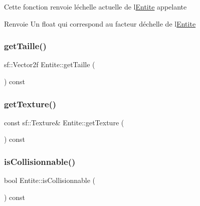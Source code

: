 Cette fonction renvoie l\textquotesingle{}échelle actuelle de l\textquotesingle{}\hyperlink{class_entite}{Entite} appelante \begin{DoxyReturn}{Renvoie}
Un {\ttfamily float} qui correspond au facteur d\textquotesingle{}échelle de l\textquotesingle{}\hyperlink{class_entite}{Entite} 
\end{DoxyReturn}
\mbox{\label{class_entite_ac9ce99e4eb26bb9c4b9f2c8aaf3899c8}} 
\subsubsection{\texorpdfstring{get\+Taille()}{getTaille()}}
{\footnotesize\ttfamily sf\+::\+Vector2f Entite\+::get\+Taille (\begin{DoxyParamCaption}{ }\end{DoxyParamCaption}) const\hspace{0.3cm}{\ttfamily [inline]}}

\mbox{\label{class_entite_a49cdf7615d2afd6f4cbc781245da2c2c}} 
\subsubsection{\texorpdfstring{get\+Texture()}{getTexture()}}
{\footnotesize\ttfamily const sf\+::\+Texture\& Entite\+::get\+Texture (\begin{DoxyParamCaption}{ }\end{DoxyParamCaption}) const\hspace{0.3cm}{\ttfamily [inline]}}

\mbox{\label{class_entite_ac28aac949f2451d883aafaabb65a7b90}} 
\subsubsection{\texorpdfstring{is\+Collisionnable()}{isCollisionnable()}}
{\footnotesize\ttfamily bool Entite\+::is\+Collisionnable (\begin{DoxyParamCaption}{ }\end{DoxyParamCaption}) const\hspace{0.3cm}{\ttfamily [inline]}}

